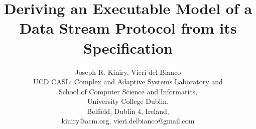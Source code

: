 \documentclass{article} \usepackage{times}
\begin{document}
\title{Deriving an Executable Model of a Data Stream Protocol from its
Specification}

\author{Joseph R. Kiniry, Vieri del Bianco\\
UCD CASL: Complex and Adaptive Systems Laboratory and\\
School of Computer Science and Informatics,\\
University College Dublin,\\
Belfield, Dublin 4, Ireland,\\
kiniry@acm.org, vieri.delbianco@gmail.com\\
}

\maketitle
\end{document}
